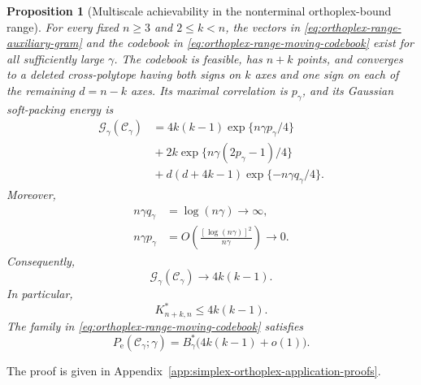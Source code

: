 \documentclass[12pt,draftclsnofoot,onecolumn]{IEEEtran}
\newcommand{\cC}{\mathcal{C}}
\newcommand{\cG}{\mathcal{G}}
\newcommand{\Pe}{P_{\mathrm e}}
\newtheorem{proposition}{Proposition}
\theoremstyle{definition}
\begin{document}
\begin{proposition}[Multiscale achievability in the nonterminal
orthoplex-bound range]
\label{prop:orthoplex-range-constructive-upper-bound}
For every fixed \(n\ge3\) and \(2\leq k<n\), the vectors in
\eqref{eq:orthoplex-range-auxiliary-gram} and the codebook in
\eqref{eq:orthoplex-range-moving-codebook} exist for all sufficiently
large \(\gamma\).  The codebook is feasible, has \(n+k\) points, and
converges to a deleted cross-polytope having both signs on \(k\) axes
and one sign on each of the remaining \(d=n-k\) axes.  Its maximal
correlation is \(p_\gamma\), and its Gaussian soft-packing energy is
\begin{equation}
\begin{aligned}
  \cG_\gamma(\cC_\gamma)
  &=4k(k-1)\exp\{n\gamma p_\gamma/4\}\\
  &{}+2k\exp\{n\gamma(2p_\gamma-1)/4\}\\
  &{}+d(d+4k-1)\exp\{-n\gamma q_\gamma/4\}.
\end{aligned}
  \label{eq:orthoplex-range-moving-energy}
\end{equation}
Moreover,
\begin{equation}
\begin{aligned}
  n\gamma q_\gamma
  &=\log(n\gamma)\longrightarrow\infty,\\
  n\gamma p_\gamma
  &=O\left(\frac{[\log(n\gamma)]^2}{n\gamma}\right)
  \longrightarrow0.
\end{aligned}
  \label{eq:orthoplex-range-moving-scales}
\end{equation}
Consequently,
\begin{equation}
  \cG_\gamma(\cC_\gamma)\longrightarrow4k(k-1).
  \label{eq:orthoplex-range-moving-energy-limit}
\end{equation}
In particular,
\begin{equation}
  K^{\ast}_{n+k,n}\leq4k(k-1).
  \label{eq:orthoplex-range-optimized-upper-bound}
\end{equation}
The family in \eqref{eq:orthoplex-range-moving-codebook} satisfies
\begin{equation}
  \Pe(\cC_\gamma;\gamma)
  =B_\gamma^{\ast}\bigl(4k(k-1)+o(1)\bigr).
  \label{eq:orthoplex-range-achievable-error}
\end{equation}
\end{proposition}

\begin{IEEEproof}
The proof is given in
Appendix~\ref{app:simplex-orthoplex-application-proofs}.
\end{IEEEproof} 
\end{document}

